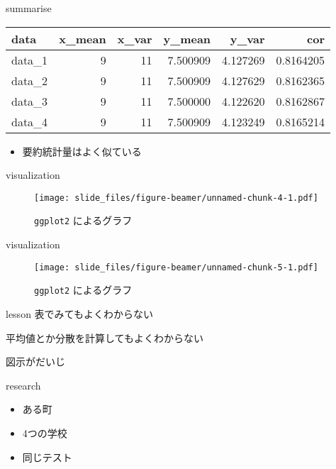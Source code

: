 \documentclass[
  ignorenonframetext,
]{beamer}
\providecommand{\tightlist}{%
  \setlength{\itemsep}{0pt}\setlength{\parskip}{0pt}}
\begin{document}
\begin{frame}{summarise}
\protect\hypertarget{summarise}{}
\begin{longtable}[]{@{}lrrrrr@{}}
\toprule()
data & x\_mean & x\_var & y\_mean & y\_var & cor \\
\midrule()
\endhead
data\_1 & 9 & 11 & 7.500909 & 4.127269 & 0.8164205 \\
data\_2 & 9 & 11 & 7.500909 & 4.127629 & 0.8162365 \\
data\_3 & 9 & 11 & 7.500000 & 4.122620 & 0.8162867 \\
data\_4 & 9 & 11 & 7.500909 & 4.123249 & 0.8165214 \\
\bottomrule()
\end{longtable}

\begin{itemize}
\tightlist
\item
  要約統計量はよく似ている
\end{itemize}
\end{frame}

\begin{frame}[fragile]{visualization}
\protect\hypertarget{visualization}{}
\begin{figure}
\centering
\texttt{[image: slide\_files/figure-beamer/unnamed-chunk-4-1.pdf]}
\caption{\texttt{ggplot2} によるグラフ}
\end{figure}
\end{frame}

\begin{frame}[fragile]{visualization}
\protect\hypertarget{visualization-1}{}
\begin{figure}
\centering
\texttt{[image: slide\_files/figure-beamer/unnamed-chunk-5-1.pdf]}
\caption{\texttt{ggplot2} によるグラフ}
\end{figure}
\end{frame}

\begin{frame}{lesson}
\protect\hypertarget{lesson}{}
表でみてもよくわからない

平均値とか分散を計算してもよくわからない

図示がだいじ
\end{frame}

\begin{frame}{research}
\protect\hypertarget{research}{}
\LARGE

\begin{itemize}[<+->]
\tightlist
\item
  \textbullet ある町
\item
  \textbullet\hspace{1pt} 4つの学校
\item
  \textbullet 同じテスト
\end{itemize}
\end{frame}
\end{document}
